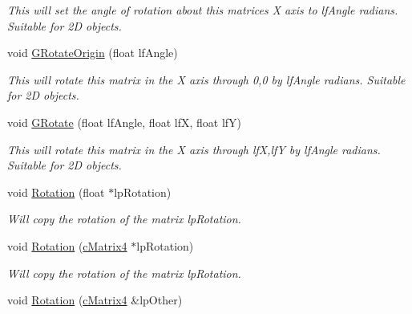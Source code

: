 \begin{DoxyCompactItemize}
\begin{DoxyCompactList}\small\item\em This will set the angle of rotation about this matrices X axis to lfAngle radians. Suitable for 2D objects. \end{DoxyCompactList}\item 
\hypertarget{classc_matrix4_a04a196147274eb6b3d1aca1782c26091}{
void \hyperlink{classc_matrix4_a04a196147274eb6b3d1aca1782c26091}{GRotateOrigin} (float lfAngle)}
\label{classc_matrix4_a04a196147274eb6b3d1aca1782c26091}

\begin{DoxyCompactList}\small\item\em This will rotate this matrix in the X axis through 0,0 by lfAngle radians. Suitable for 2D objects. \end{DoxyCompactList}\item 
\hypertarget{classc_matrix4_a5115db44a0c51d97be3d5791fb19d18a}{
void \hyperlink{classc_matrix4_a5115db44a0c51d97be3d5791fb19d18a}{GRotate} (float lfAngle, float lfX, float lfY)}
\label{classc_matrix4_a5115db44a0c51d97be3d5791fb19d18a}

\begin{DoxyCompactList}\small\item\em This will rotate this matrix in the X axis through lfX,lfY by lfAngle radians. Suitable for 2D objects. \end{DoxyCompactList}\item 
\hypertarget{classc_matrix4_aeca3db3711d09781ec4ecf78a0423574}{
void \hyperlink{classc_matrix4_aeca3db3711d09781ec4ecf78a0423574}{Rotation} (float $\ast$lpRotation)}
\label{classc_matrix4_aeca3db3711d09781ec4ecf78a0423574}

\begin{DoxyCompactList}\small\item\em Will copy the rotation of the matrix lpRotation. \end{DoxyCompactList}\item 
\hypertarget{classc_matrix4_a2777b2361f3656d4f8c1413456ea22d2}{
void \hyperlink{classc_matrix4_a2777b2361f3656d4f8c1413456ea22d2}{Rotation} (\hyperlink{classc_matrix4}{cMatrix4} $\ast$lpRotation)}
\label{classc_matrix4_a2777b2361f3656d4f8c1413456ea22d2}

\begin{DoxyCompactList}\small\item\em Will copy the rotation of the matrix lpRotation. \end{DoxyCompactList}\item 
\hypertarget{classc_matrix4_aa3eadfc363f0d3696e8f9468ccd3782b}{
void \hyperlink{classc_matrix4_aa3eadfc363f0d3696e8f9468ccd3782b}{Rotation} (\hyperlink{classc_matrix4}{cMatrix4} \&lpOther)}
\label{classc_matrix4_aa3eadfc363f0d3696e8f9468ccd3782b}


\end{DoxyCompactItemize}
